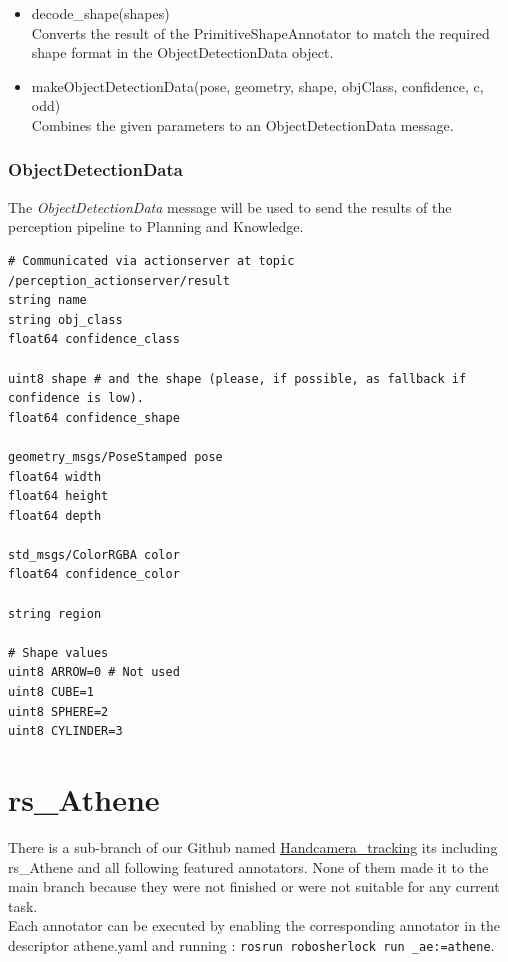 \documentclass[main.tex]{subfiles}
\begin{document}
\begin{itemize}
\item decode\_shape(shapes)\\
Converts the result of the PrimitiveShapeAnnotator to match the required shape format in the ObjectDetectionData object.

\item makeObjectDetectionData(pose, geometry, shape, objClass, confidence, c, odd)\\
Combines the given parameters to an ObjectDetectionData message.
\end{itemize}

\subsubsection{ObjectDetectionData}
The \textit{ObjectDetectionData} message will be used to send the results of the perception pipeline to Planning and Knowledge.

\begin{lstlisting}
# Communicated via actionserver at topic /perception_actionserver/result
string name
string obj_class
float64 confidence_class

uint8 shape # and the shape (please, if possible, as fallback if confidence is low). 
float64 confidence_shape

geometry_msgs/PoseStamped pose
float64 width
float64 height
float64 depth

std_msgs/ColorRGBA color
float64 confidence_color

string region

# Shape values
uint8 ARROW=0 # Not used
uint8 CUBE=1
uint8 SPHERE=2
uint8 CYLINDER=3
\end{lstlisting}

			\section{rs\_Athene}
There is a sub-branch of our Github named \href{https://github.com/SUTURO/suturo_perception/tree/Handcamera_tracking}{Handcamera\_tracking}
its including rs\_Athene and all following featured annotators. 
None of them made it to the main branch because they were not finished or were not suitable for any current task. \\
Each annotator can be executed by enabling the corresponding annotator in the descriptor athene.yaml and running : \texttt{rosrun robosherlock run \_ae:=athene}. 
\end{document}
